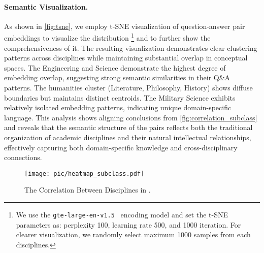 \paragraph{Semantic Visualization.} As shown in \autoref{fig:tsne}, we employ t-SNE visualization of question-answer pair embeddings to visualize the distribution \benchmark \footnote{We use the \texttt{gte-large-en-v1.5}~\citep{li2023towards,zhang2024mgte} encoding model and set the t-SNE parameters as: perplexity 100, learning rate 500, and 1000 iteration. For clearer visualization, we randomly select maximum 1000 samples from each disciplines.} and to further show the comprehensiveness of it.
The resulting visualization demonstrates clear clustering patterns across disciplines while maintaining substantial overlap in conceptual spaces.
The Engineering and Science demonstrate the highest degree of embedding overlap, suggesting strong semantic similarities in their Q\&A patterns. The humanities cluster (Literature, Philosophy, History) shows diffuse boundaries but maintains distinct centroids. The Military Science exhibits relatively isolated embedding patterns, indicating unique domain-specific language.
This analysis shows aligning conclusions from \autoref{fig:correlation_subclass} and reveals that the semantic structure of the \benchmark pairs reflects both the traditional organization of academic disciplines and their natural intellectual relationships, effectively capturing both domain-specific knowledge and cross-disciplinary connections.

 
\begin{figure}[ht]
    \centering
    \texttt{[image: pic/heatmap\_subclass.pdf]}
    \caption{The Correlation Between Disciplines in \benchmark.}
    \label{fig:correlation_subclass}
\end{figure}

